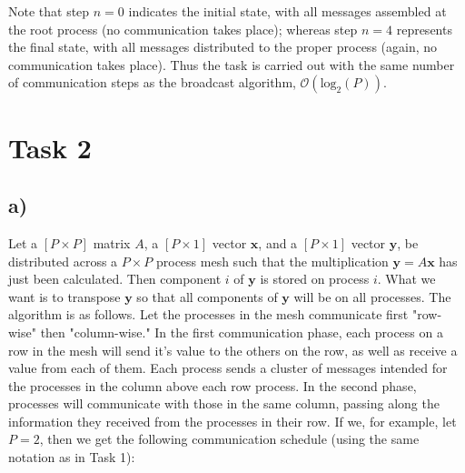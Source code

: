 \documentclass[a4paper,11pt]{article}
\renewcommand{\vec}[1]{\mathbf{#1}}
\begin{document}
Note that step $n=0$ indicates the initial state, with all messages assembled at the root process (no communication takes place); whereas step $n=4$ represents the final state, with all messages distributed to the proper process (again, no communication takes place).  Thus the task is carried out with the same number of communication steps as the broadcast algorithm, $\mathcal{O}(\text{log}_2(P))$.
 
\section*{Task 2}
\subsection*{a)}
Let a $[P \times P]$ matrix $A$, a $[P \times 1]$ vector $\vec{x}$, and a $[P \times 1]$ vector $\vec{y}$, be distributed across a $P \times P$ process mesh such that the multiplication $\vec{y} = A \vec{x}$ has just been calculated.  Then component $i$ of $\vec{y}$ is stored on process $i$.  What we want is to transpose $\vec{y}$ so that all components of  $\vec{y}$ will be on all processes.  The algorithm is as follows.  Let the processes in the mesh communicate first "row-wise" then "column-wise."  In the first communication phase, each process on a row in the mesh will send it's value to the others on the row, as well as receive a value from each of them.  Each process sends a cluster of messages intended for the processes in the column above each row process.  In the second phase, processes will communicate with those in the same column, passing along the information they received from the processes in their row.  If we, for example, let $P=2$, then we get the following communication schedule (using the same notation as in Task 1):
\end{document}
